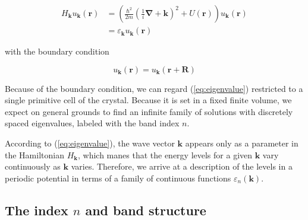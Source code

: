 		\begin{align} \label{eq:eigenvalue}
			H_{\mathbf{k}} u_{\mathbf{k}} (\mathbf{r})
			&= \left( \frac{\hbar^2}{2m}
			\left(\frac{1}{i} \boldsymbol{\nabla}
			+ \mathbf{k} \right)^2
			+ U(\mathbf{r}) \right)
			u_\mathbf{k} (\mathbf{r}) \\
			&= \varepsilon_{\mathbf{k}} 
			u_\mathbf{k}(\mathbf{r})
		\end{align}

		with the boundary condition

		\begin{equation*}
			u_\mathbf{k} (\mathbf{r})
			= u_\mathbf{k} (\mathbf{r} + \mathbf{R})
		\end{equation*}

		Because of the boundary condition, we can regard (\ref{eq:eigenvalue}) restricted to a single primitive cell of the crystal. Because it is set in a fixed finite volume, we expect on general grounds to find an infinite family of solutions with discretely spaced eigenvalues, labeled with the band index $n$.

		According to (\ref{eq:eigenvalue}), the wave vector $\mathbf{k}$ appears only as a parameter in the Hamiltonian $H_{\mathbf{k}}$, which manes that the energy levels for a given $\mathbf{k}$ vary continuously as $\mathbf{k}$ varies. Therefore, we arrive at a description of the levels in a periodic potential in terms of a family of continuous functions $\varepsilon_{n} (\mathbf{k})$. 

	\subsection{The index $n$ and band structure}


















